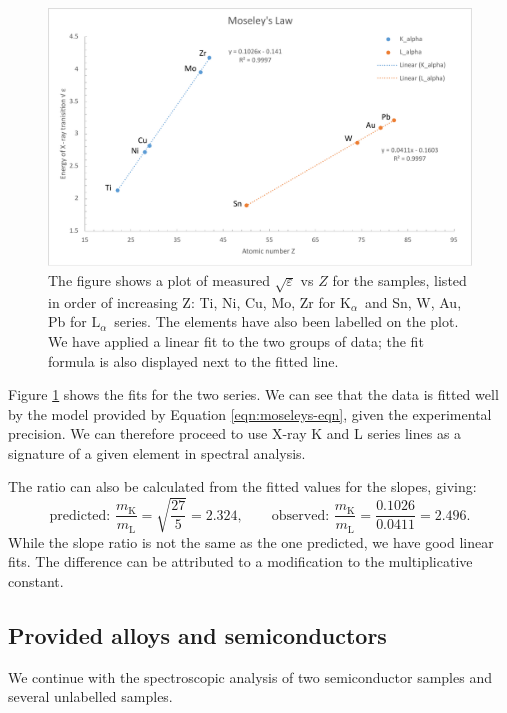 \documentclass[11pt,a4paper,twoside,onecolumn]{article}
\newcommand{\Kalpha}{$\mathrm{K}_\alpha$~}
\newcommand{\Lalpha}{$\mathrm{L}_\alpha$~}
\begin{document}
\begin{figure}[!htbp]
    \centering
    \includegraphics[width=\textwidth]{img/moseleys.pdf}
    \caption{The figure shows a plot of measured $\sqrt{\varepsilon}$ vs $Z$ for the samples, listed in order of increasing Z: Ti, Ni, Cu, Mo, Zr for \Kalpha and Sn, W, Au, Pb for \Lalpha series. The elements have also been labelled on the plot. We have applied a linear fit to the two groups of data; the fit formula is also displayed next to the fitted line.}\label{fig:moseleys}
\end{figure}

Figure \ref{fig:moseleys} shows the fits for the two series. We can see that the data is fitted well by the model provided by Equation \eqref{eqn:moseleys-eqn}, given the experimental precision. We can therefore proceed to use X-ray K and L series lines as a signature of a given element in spectral analysis.

The ratio can also be calculated from the fitted values for the slopes, giving:
\begin{equation}
    \text{predicted: }\frac{m_\mathrm{K}}{m_\mathrm{L}} = \sqrt{\frac{27}{5}} = 2.324,\qquad \text{observed: } \frac{m_\mathrm{K}}{m_\mathrm{L}} = \frac{0.1026}{0.0411} = 2.496.
\end{equation}
While the slope ratio is not the same as the one predicted, we have good linear fits. The difference can be attributed to a modification to the multiplicative constant.

\subsection{Provided alloys and semiconductors}
We continue with the spectroscopic analysis of two semiconductor samples and several unlabelled samples.
\end{document}
